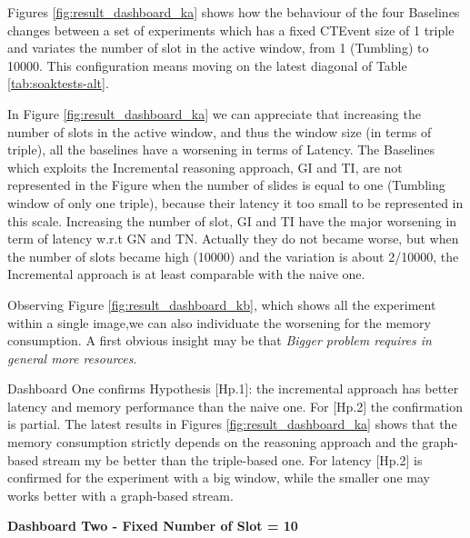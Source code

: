 Figures \ref{fig:result_dashboard_ka} shows how the behaviour of the four Baselines changes between a set of experiments which has a fixed CTEvent size of 1 triple and variates the number of slot in the active window, from 1 (Tumbling) to 10000. This configuration means moving on the latest diagonal of Table \ref{tab:soaktests-alt}.

In Figure \ref{fig:result_dashboard_ka} we can appreciate that increasing the number of slots in the active window, and thus the window size (in terms of triple), all the baselines have a worsening in terms of Latency. The Baselines which exploits the Incremental reasoning approach, GI and TI, are not represented in the Figure when the number of slides is equal to one (Tumbling window of only one triple), because their latency it too small to be represented in this scale. Increasing the number of slot, GI and TI have the major worsening in term of latency w.r.t GN and TN. Actually they do not became worse, but when the number of slots became high (10000) and the variation is about 2/10000, the Incremental approach is at least comparable with the naive one.

Observing Figure \ref{fig:result_dashboard_kb}, which shows all the experiment within a single image,we can also individuate the worsening for the memory consumption. A first obvious insight may be that \textit{Bigger problem requires in general more resources}. %

Dashboard One confirms Hypothesis [Hp.1]: the incremental approach has better latency and memory performance than the naive one. For [Hp.2] the confirmation is partial. The latest results in Figures \ref{fig:result_dashboard_ka} shows that the memory consumption strictly depends on the reasoning approach and the graph-based stream my be better than the triple-based one. For latency [Hp.2] is confirmed for the experiment with a big window, while the smaller one may works better with a graph-based stream.


\textbf{Dashboard Two - Fixed Number of Slot = 10}


